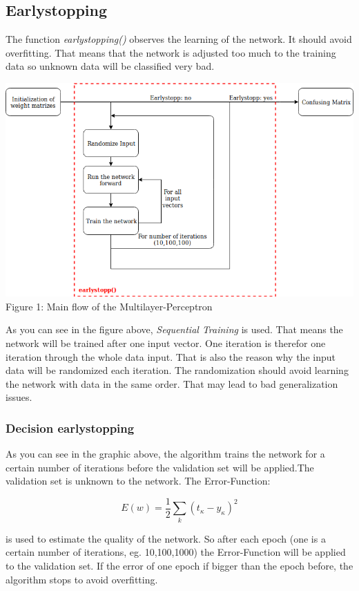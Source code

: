 \documentclass[10pt,a4paper]{article}
\begin{document}
	\subsection{Earlystopping}				%
	The function \textit{earlystopping()} observes the learning of the network. It should avoid overfitting. That means that the network is adjusted too much to the training data so unknown data will be classified very bad.
	\begin{center}
		\includegraphics[width=0.9\linewidth]{"pictures/Untitled Diagram"} \\
		Figure 1: Main flow of the Multilayer-Perceptron 
	\end{center}
	As you can see in the figure above, \textit{Sequential Training} is used. That means the network will be trained after one input vector. One iteration is therefor one iteration through the whole data input. That is also the reason why the input data will be randomized each iteration. The randomization should avoid learning the network with data in the same order. That may lead to bad generalization issues.
	\subsubsection{Decision earlystopping}		%
	 As you can see in the graphic above, the algorithm trains the network for a certain number of iterations before the validation set will be applied.The validation set is unknown to the network. The Error-Function: \\
	 	\begin{center}
	 	\begin{equation}
	 	E(w) = \frac{1}{2} \sum_{k} (t_{\kappa} - y_{\kappa})^{2}
	 	\end{equation} 
	 \end{center}
 	is used to estimate the quality of the network. So after each epoch (one is a certain number of iterations, eg. 10,100,1000) the Error-Function will be applied to the validation set. If the error of one epoch if bigger than the epoch before, the algorithm stops to avoid overfitting.
	 
\end{document}
